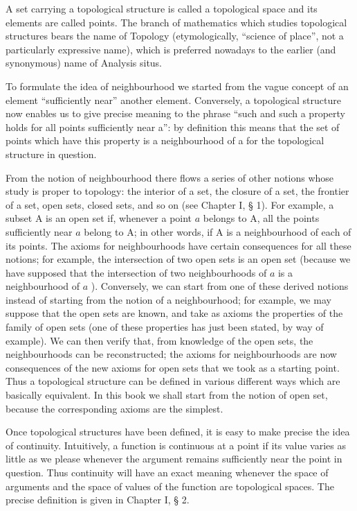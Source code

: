 A set carrying a topological structure is called a topological space and its elements are called points. The branch of mathematics which studies topological structures bears the name of Topology (etymologically, ``science of place'', not a particularly expressive name), which is preferred nowadays to the earlier (and synonymous) name of Analysis situs.

To formulate the idea of neighbourhood we started from the vague concept of an element ``sufficiently near'' another element. Conversely, a topological structure now enables us to give precise meaning to the phrase ``such and such a property holds for all points sufficiently near a'': by definition this means that the set of points which have this property is a neighbourhood of a for the topological structure in question.

From the notion of neighbourhood there flows a series of other notions whose study is proper to topology: the interior of a set, the closure of a set, the frontier of a set, open sets, closed sets, and so on (see Chapter I, § 1). For example, a subset A is an open set if, whenever a point \(a\) belongs to A, all the points sufficiently near \(a\) belong to A; in other words, if A is a neighbourhood of each of its points. The axioms for neighbourhoods have certain consequences for all these notions; for example, the intersection of two open sets is an open set (because we have supposed that the intersection of two neighbourhoods of \(a\) is a neighbourhood of \(a\) ). Conversely, we can start from one of these derived notions instead of starting from the notion of a neighbourhood; for example, we may suppose that the open sets are known, and take as axioms the properties of the family of open sets (one of these properties has just been stated, by way of example). We can then verify that, from knowledge of the open sets, the neighbourhoods can be reconstructed; the axioms for neighbourhoods are now consequences of the new axioms for open sets that we took as a starting point. Thus a topological structure can be defined in various different ways which are basically equivalent. In this book we shall start from the notion of open set, because the corresponding axioms are the simplest.

Once topological structures have been defined, it is easy to make precise the idea of continuity. Intuitively, a function is continuous at a point if its value varies as little as we please whenever the argument remains sufficiently near the point in question. Thus continuity will have an exact meaning whenever the space of arguments and the space of values of the function are topological spaces. The precise definition is given in Chapter I, § 2.

